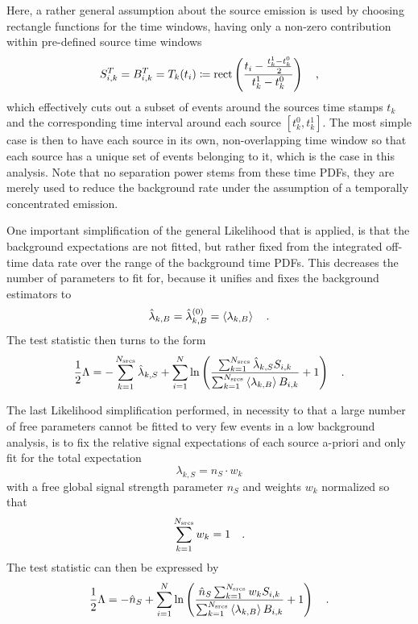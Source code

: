 Here, a rather general assumption about the source emission is used by choosing rectangle functions for the time windows, having only a non-zero contribution within pre-defined source time windows
\begin{equation}
  S_{i,k}^T = B_{i,k}^T = T_k(t_i) \coloneqq
    \operatorname{rect}\left(\frac{t_i - \frac{t_k^1-t_k^0}{2}}
                              {t_k^1-t_k^0}\right)
  \quad\text{,}
\end{equation}
which effectively cuts out a subset of events around the sources time stamps $t_k$ and the corresponding time interval around each source $[t_k^0, t_k^1]$.
The most simple case is then to have each source in its own, non-overlapping time window so that each source has a unique set of events belonging to it, which is the case in this analysis.
Note that no separation power stems from these time PDFs, they are merely used to reduce the background rate under the assumption of a temporally concentrated emission.

One important simplification of the general Likelihood that is applied, is that the background expectations are not fitted, but rather fixed from the integrated off-time data rate over the range of the background time PDFs.
This decreases the number of parameters to fit for, because it unifies and fixes the background estimators to
\begin{equation}
  \hat{\lambda}_{k,B} = \hat{\lambda}_{k,B}^{(0)} = \Braket{\lambda_{k,B}}
  \quad\text{.}
\end{equation}
The test statistic then turns to the form
\begin{equation}
  \frac{1}{2}\Lambda
  = -\sum_{k=1}^{N_\text{srcs}}\hat{\lambda}_{k,S} +
    \sum_{i=1}^N \ln\left(
      \frac{\sum_{k=1}^{N_\text{srcs}}\hat{\lambda}_{k,S} S_{i,k}}
           {\sum_{k=1}^{N_\text{srcs}}\Braket{\lambda_{k,B}} B_{i,k}}
      + 1 \right)
  \quad\text{.}
\end{equation}

The last Likelihood simplification performed, in necessity to that a large number of free parameters cannot be fitted to very few events in a low background analysis, is to fix the relative signal expectations of each source a-priori and only fit for the total expectation
\begin{equation}
  \lambda_{k,S} = n_S \cdot w_k
\end{equation}
with a free global signal strength parameter $n_S$ and weights $w_k$ normalized so that
\begin{equation}
  \sum_{k=1}^{N_\text{srcs}} w_k = 1
  \quad\text{.}
\end{equation}
The test statistic can then be expressed by
\begin{equation}
  \frac{1}{2}\Lambda
  = -\hat{n}_S +
    \sum_{i=1}^N \ln\left(
      \frac{\hat{n}_S \sum_{k=1}^{N_\text{srcs}} w_k S_{i,k}}
           {\sum_{k=1}^{N_\text{srcs}}\Braket{\lambda_{k,B}} B_{i,k}}
      + 1 \right)
  \quad\text{.}
\end{equation}

